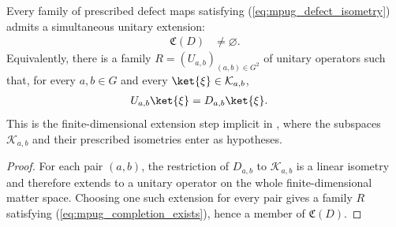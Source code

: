 \begin{lemma}
    \label{thm:mpug_completion_class_nonempty}
    \leanok
    Every family of prescribed defect maps satisfying
    (\ref{eq:mpug_defect_isometry}) admits a simultaneous unitary extension:
    \begin{align}
        \mathfrak C(D) & \neq\varnothing.
        \label{eq:mpug_completion_class_nonempty}
    \end{align}
    Equivalently, there is a family
    $R=(U_{a,b})_{(a,b)\in G^2}$ of unitary operators such that, for every
    $a,b\in G$ and every $\ket{\xi}\in\mathcal K_{a,b}$,
    \begin{align}
        U_{a,b}\ket{\xi}
         & =D_{a,b}\ket{\xi}.
        \label{eq:mpug_completion_exists}
    \end{align}
    This is the finite-dimensional extension step implicit in
    \cite[lines~4215--4326]{FrancoRubio2025MPUGauging}, where the subspaces
    $\mathcal K_{a,b}$ and their prescribed isometries enter as hypotheses.
\end{lemma}

\begin{proof}\leanok
    For each pair $(a,b)$, the restriction of $D_{a,b}$ to
    $\mathcal K_{a,b}$ is a linear isometry and therefore extends to a unitary
    operator on the whole finite-dimensional matter space. Choosing one such
    extension for every pair gives a family $R$ satisfying
    (\ref{eq:mpug_completion_exists}), hence a member of $\mathfrak C(D)$.
\end{proof}

